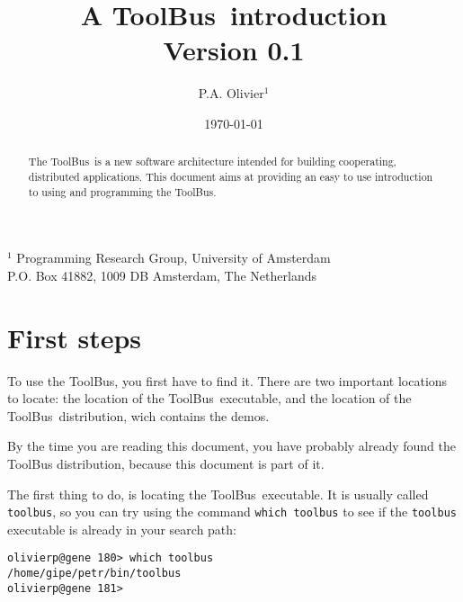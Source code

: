 \documentclass[a4paper,twoside]{article} %
\begin{document}
\newcommand{\TB}{{\sc ToolBus}}
\newcommand{\T}{{\bf T}}
\newcommand{\spec}[1]{{\rm #1}}
\newcommand{\script}[1]{{\tt #1}}
\newcommand{\ASFSDF}{{\sc Asf+Sdf}}
\newcommand{\ASF}{{\sc Asf}}
\newcommand{\SDF}{{\sc Sdf}}
\newcommand{\GEL}{{\sc Gel}}
\newcommand{\iter}{\,^*\,}
\newcommand{\emp}[1]{{\em #1}}
\newcommand{\txttt}[1]{{\tt #1}}

\title{A \TB\ introduction \\
Version 0.1}
\author{P.A. Olivier$^{1}$}
\date{\today}
\maketitle
\begin{center}
       {\footnotesize $^1$ Programming Research Group, University of Amsterdam\\
        P.O. Box 41882, 1009 DB Amsterdam, The Netherlands}
\end{center}

\begin{abstract}

The \TB\ is a new software architecture intended for building
cooperating, distributed applications.  This document aims
at providing an easy to use introduction to using and programming
the ToolBus.
\end{abstract}

\tableofcontents

\newpage

\section{First steps}

To use the \TB, you first have to find it. There are two important
locations to locate: the location of the \TB\ executable, and the
location of the \TB\ distribution, wich contains the demos.

By the time you are reading this document, you have probably already
found the ToolBus distribution, because this document is part of it.

The first thing to do, is locating the \TB\ executable. It is usually
called {\tt toolbus}, so you can try using the command {\tt which toolbus}
to see if the {\tt toolbus} executable is already in your
search path:

\begin{verbatim}
olivierp@gene 180> which toolbus
/home/gipe/petr/bin/toolbus
olivierp@gene 181>
\end{verbatim}
\end{document}
